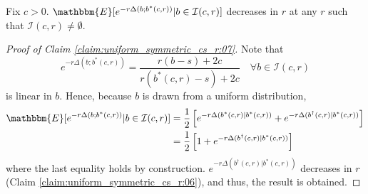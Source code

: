 \begin{appendices}
\begin{claim}\label{claim:uniform_symmetric_cs_r:07} 
Fix $c>0$. $\mathbbm{E}[e^{-r\Delta(b;b^*(c,r))}|b\in \mathcal{I}(c,r)]$ decreases in $r$ at any $r$ such that $\mathcal{I}(c,r)\neq\emptyset$. 
\end{claim}

\begin{proof}[Proof of Claim \ref{claim:uniform_symmetric_cs_r:07}] 
Note that
    $$
    e^{-r\Delta(b;b^*(c,r))}=\frac{r(b-s)+2c}{r(b^*(c,r)-s)+2c} \quad\forall b\in \mathcal{I}(c,r)
    $$
is linear in $b$. Hence, because $b$ is drawn from a uniform distribution, 
    \begin{align*}
    \mathbbm{E}[e^{-r\Delta(b;b^*(c,r))}|b\in \mathcal{I}(c,r)] 
    & = 
    \frac{1}{2}\left[e^{-r\Delta(b^*(c,r)|b^*(c,r))}+e^{-r\Delta(b^\dagger(c,r)|b^*(c,r))}\right]
    \\
    &=
    \frac{1}{2}\left[1+e^{-r\Delta(b^\dagger(c,r)|b^*(c,r))}\right]
    \end{align*}
where the last equality holds by construction. $e^{-r\Delta(b^\dagger(c,r)|b^*(c,r))}$ decreases in $r$ (Claim \ref{claim:uniform_symmetric_cs_r:06}), and thus, the result is obtained. 
\end{proof}



\end{appendices}

